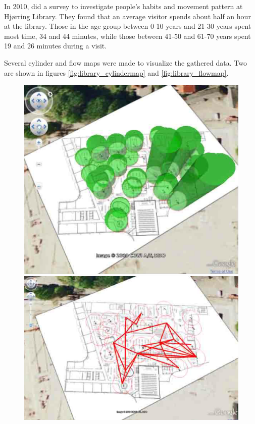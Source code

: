 
In 2010, \citep{hjoerring_study} did a survey to investigate people's habits and movement pattern at Hj{\o}rring Library. They found that an average visitor spends about half an hour at the library. Those in the age group between 0-10 years and 21-30 years spent most time, 34 and 44 minutes, while those between 41-50 and 61-70 years spent 19 and 26 minutes during a visit.

Several cylinder and flow maps were made to visualize the gathered data. Two are shown in figures \ref{fig:library_cylindermap} and \ref{fig:library_flowmap}.

\begin{figure}[htbp] \centering
\begin{minipage}[b]{0.45\textwidth} \centering
\includegraphics[width=1.00\textwidth]{Pictures/HjoerringLibrary/library_cylinder_diagram_24Nov.png} %
\end{minipage} \hfill
\begin{minipage}[b]{0.45\textwidth} \centering
\includegraphics[width=1.00\textwidth]{Pictures/HjoerringLibrary/library_flow_Nov21.png} %

\end{minipage}
\end{figure}
